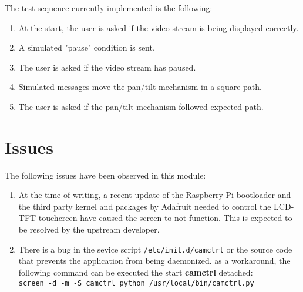 The test sequence currently implemented is the following:

   \begin{enumerate}
      \item At the start, the user is asked if the video stream is being
         displayed correctly.
      \item A simulated "pause" condition is sent.
      \item The user is asked if the video stream has paused.
      \item Simulated messages move the pan/tilt mechanism in a square path.
      \item The user is asked if the pan/tilt mechanism followed expected path.
   \end{enumerate}

\section{Issues}
The following issues have been observed in this module:
   \begin{enumerate}
      \item At the time of writing, a recent update of the Raspberry Pi
         bootloader and the third party kernel and packages by Adafruit needed
         to control the LCD-TFT touchcreen have caused the screen to not
         function. This is expected to be resolved by the upstream developer.
      \item There is a bug in the sevice script \texttt{/etc/init.d/camctrl} or
         the source code that prevents the application from being daemonized. as
         a workaround, the following command can be executed the start
         \textbf{camctrl} detached:\\
         \texttt{screen -d -m -S camctrl python /usr/local/bin/camctrl.py}
   \end{enumerate}

